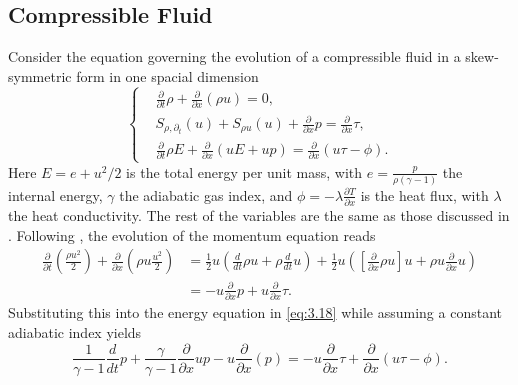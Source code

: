 \subsection{Compressible Fluid} \label{sec:skew.3}
Consider the equation governing the evolution of a compressible fluid in a skew-symmetric form in one spacial dimension
\begin{equation} \label{eq:3.18}
\left\{
\begin{aligned}
	&\frac{\partial}{\partial t} \rho + \frac{\partial }{\partial x}(\rho u) = 0, \\ 
	& S_{\rho,\partial_t}(u)+ S_{\rho u}(u) + \frac{\partial }{\partial x} p = \frac{\partial }{\partial x} \tau, \\
	&\frac{\partial}{\partial t} \rho E + \frac{\partial}{\partial x}(u E + up) = \frac{\partial }{\partial x}(u\tau - \phi).
\end{aligned}
\right.
\end{equation}
Here $E= e + u^2/2$ is the total energy per unit mass, with $e = \frac{p}{\rho(\gamma - 1)}$ the internal energy, $\gamma$ the adiabatic gas index, and $\phi = -\lambda \frac{\partial T}{\partial x}$ is the heat flux, with $\lambda$ the heat conductivity. The rest of the variables are the same as those discussed in . Following \cite{reiss2014conservative}, the evolution of the momentum equation reads
\begin{equation} \label{eq:3.19}
	\begin{aligned}
	\frac{\partial}{\partial t}(\frac{\rho u^2}{2}) + \frac{\partial }{\partial x}(\rho u \frac{u^2}{2}) &= \frac 1 2 u( \frac{d}{dt} \rho u + \rho \frac{d}{dt} u ) + \frac 1 2 u ( [ \frac{\partial}{\partial x} \rho u ] u + \rho u \frac{\partial }{\partial x} u ) \\
	& = - u \frac{\partial}{\partial x} p + u \frac{\partial}{\partial x} \tau.
	\end{aligned}
\end{equation}
Substituting this into the energy equation in \eqref{eq:3.18} while assuming a constant adiabatic index yields
\begin{equation} \label{eq:3.20}
	\frac{1}{\gamma -1} \frac{d}{dt} p + \frac{\gamma}{\gamma -1} \frac{\partial }{\partial x} up - u \frac{\partial }{\partial x}(p) = - u \frac{\partial}{\partial x} \tau + \frac{\partial }{\partial x}(u\tau - \phi).
\end{equation}

